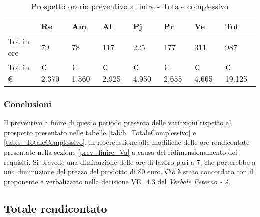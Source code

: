 					\begin{table}[H] \begin{center} \begin{tabular}{llllllll}
					\toprule
						&	\textbf{Re}	&	\textbf{Am}	&	\textbf{At}	&	\textbf{Pj}	&	\textbf{Pr}	&	\textbf{Ve}	&	\textbf{Tot}	 \\
						\midrule
						Tot in ore	&	79		&	78		&	117		&	225		&	177		&	311		&	987	\\
						Tot in €	&	 € 2.370 		 & 	 € 1.560 		 & 	 € 2.925 		 & 	 € 4.950 		 & 	 € 2.655 		 & 	 € 4.665 		 & 	 € 19.125 	\\
						\bottomrule
					\end{tabular} \end{center} \caption{Prospetto orario preventivo a finire -
					Totale complessivo} \end{table}


		\subsubsection{Conclusioni} Il preventivo a finire di questo periodo presenta delle variazioni rispetto al prospetto presentato nelle tabelle \ref{tab:h_TotaleComplessivo} e \ref{tab:s_TotaleComplessivo}, in ripercussione alle modifiche delle ore rendicontate presentate nella sezione \ref{prev_finire_Va} a causa del ridimensionamento dei requisiti. Si prevede una diminuzione delle ore di lavoro pari a 7, che porterebbe a una diminuzione del prezzo del prodotto di 80 euro. Ciò è stato concordato con il proponente e verbalizzato nella decisione VE\_4.3 del \textit{Verbale Esterno - 4}.
	\newpage
	\subsection{Totale rendicontato}
